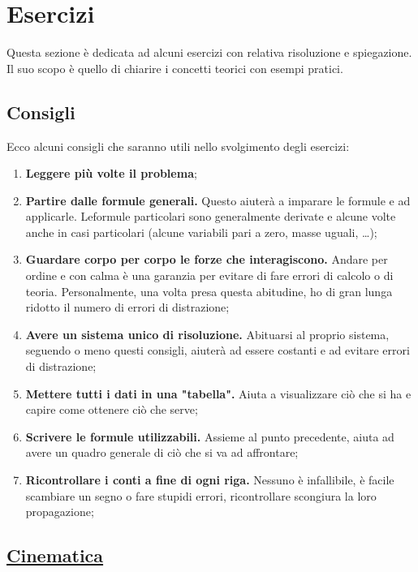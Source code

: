 
\section{Esercizi}
Questa sezione è dedicata ad alcuni esercizi con relativa risoluzione e spiegazione. Il suo scopo
è quello di chiarire i concetti teorici con esempi pratici.

\subsection*{Consigli}
Ecco alcuni consigli che saranno utili nello svolgimento degli esercizi:
\begin{enumerate}
	\item \textbf{Leggere più volte il problema};
	\item \textbf{Partire dalle formule generali.} Questo aiuterà a imparare le formule e ad 
	applicarle. Leformule particolari sono generalmente derivate e alcune volte anche in casi 
        particolari (alcune variabili pari a zero, masse uguali, \ldots);
	\item \textbf{Guardare corpo per corpo le forze che interagiscono.} Andare per ordine e con calma 
	è una garanzia per evitare di fare errori di calcolo o di teoria. Personalmente, una volta presa
	questa abitudine, ho di gran lunga ridotto il numero di errori di distrazione;
	\item \textbf{Avere un sistema unico di risoluzione.} Abituarsi al proprio sistema, seguendo o 
	meno questi consigli, aiuterà ad essere costanti e ad evitare errori di distrazione;
	\item \textbf{Mettere tutti i dati in una "tabella".} Aiuta a visualizzare ciò che si ha e capire
	come ottenere ciò che serve;
	\item \textbf{Scrivere le formule utilizzabili.} Assieme al punto precedente, aiuta ad avere un
	quadro generale di ciò che si va ad affrontare;
	\item \textbf{Ricontrollare i conti a fine di ogni riga.} Nessuno è infallibile, è facile 
	scambiare un segno o fare stupidi errori, ricontrollare scongiura la loro propagazione;
\end{enumerate}

\subsection*{\hyperref[sec:cinematica]{Cinematica}}\label{ex:cinematica}

